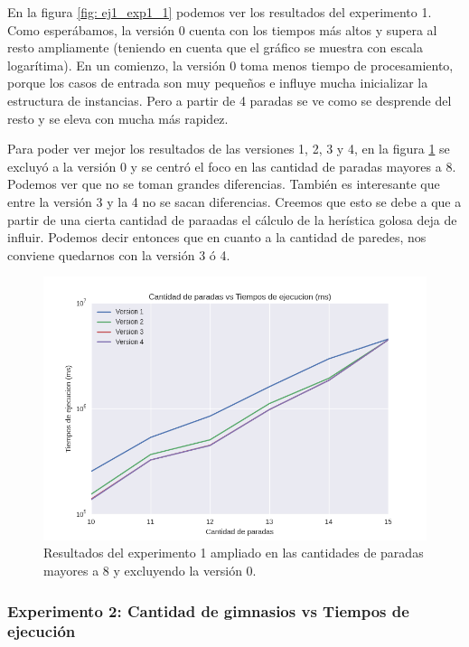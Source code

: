 \par En la figura \ref{fig: ej1_exp1_1} podemos ver los resultados del experimento 1. Como esperábamos, la versión 0 cuenta con los tiempos más altos y supera al resto ampliamente (teniendo en cuenta que el gráfico se muestra con escala logarítima). En un comienzo, la versión 0 toma menos tiempo de procesamiento, porque los casos de entrada son muy pequeños e influye mucha inicializar la estructura de instancias. Pero a partir de 4 paradas se ve como se desprende del resto y se eleva con mucha más rapidez.

\par Para poder ver mejor los resultados de las versiones 1, 2, 3 y 4, en la figura \ref{fig: ej1_exp1_2} se excluyó a la versión 0 y se centró el foco en las cantidad de paradas mayores a 8. Podemos ver que no se toman grandes diferencias. También es interesante que entre la versión 3 y la 4 no se sacan diferencias. Creemos que esto se debe a que a partir de una cierta cantidad de paraadas el cálculo de la herística golosa deja de influir. Podemos decir entonces que en cuanto a la cantidad de paredes, nos conviene quedarnos con la versión 3 ó 4.

\begin{figure}[H]
	\begin{center}
		\includegraphics[width=\textwidth]{img/ejercicio1/exp1_2.png}
		\caption{Resultados del experimento 1 ampliado en las cantidades de paradas mayores a 8 y excluyendo la versión 0.}
		\label{fig: ej1_exp1_2}
	\end{center}
\end{figure}


\subsubsection{Experimento 2: Cantidad de gimnasios vs Tiempos de ejecución}

